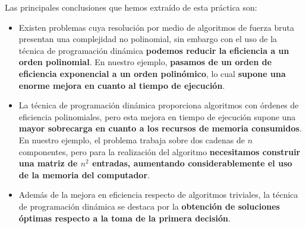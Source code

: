 Las principales conclusiones que hemos extraído de esta práctica son:

\begin{itemize}
	
	\item Existen problemas cuya resolución por medio de algoritmos de fuerza 
	bruta presentan una complejidad no polinomial, sin embargo con el uso de la 
	técnica de programación dinámica \textbf{podemos reducir la eficiencia a un orden 
	polinomial}. En nuestro ejemplo, \textbf{pasamos de un orden de eficiencia exponencial
	a un orden polinómico}, lo cual \textbf{supone una enorme mejora en cuanto al tiempo de 
	ejecución}.
	
	\item La técnica de programación dinámica proporciona algoritmos con órdenes de eficiencia
	polinomiales, pero esta mejora en tiempo de ejecución supone una \textbf{mayor sobrecarga en cuanto 
	a los recursos de memoria consumidos}. En nuestro ejemplo, el problema trabaja sobre dos cadenas de
	$n$ componentes, pero para la realización del algoritmo \textbf{necesitamos construir una matriz de $n^{2}$ 
	entradas, aumentando considerablemente el uso de la memoria del computador}.

	\item Además de la mejora en eficiencia respecto de algoritmos triviales, la técnica de programación
	dinámica se destaca por la \textbf{obtención de soluciones óptimas respecto a la toma de la primera decisión}.
	
	
\end{itemize}